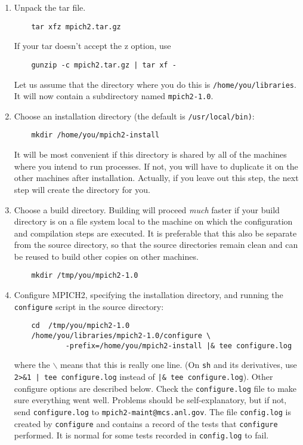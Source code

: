 \documentclass[dvipdfm,11pt]{article}
\begin{document}
\begin{enumerate}
\item 
Unpack the tar file.
\begin{verbatim}
    tar xfz mpich2.tar.gz
\end{verbatim}
If your tar doesn't accept the z option, use
\begin{verbatim}
    gunzip -c mpich2.tar.gz | tar xf -
\end{verbatim}
Let us assume that the directory where you do this is
\texttt{/home/you/libraries}.  It will now contain a subdirectory named
\texttt{mpich2-1.0}.

\item
Choose an installation directory (the default is \texttt{/usr/local/bin)}:
\begin{verbatim}
    mkdir /home/you/mpich2-install
\end{verbatim}
It will be most convenient if this directory is shared by all of the
machines where you intend to run processes.  If not, you will have
to duplicate it on the other machines after installation.  Actually, if
you leave out this step, the next step will create the directory for you.

\item
Choose a build directory.  Building will proceed \emph{much} faster if
your build directory is on a file system local to the machine on which
the configuration and compilation steps are executed.  It is preferable
that this also be separate from the source directory, so that the
source directories remain
clean and can be reused to build other copies on other machines.
\begin{verbatim}
    mkdir /tmp/you/mpich2-1.0
\end{verbatim}

\item
Configure MPICH2, specifying the installation directory, and running
the \texttt{configure} script in the source directory:
\begin{verbatim}
    cd  /tmp/you/mpich2-1.0
    /home/you/libraries/mpich2-1.0/configure \
            -prefix=/home/you/mpich2-install |& tee configure.log
\end{verbatim}
where the \texttt{$\backslash$} means that this is really one line.  (On
\texttt{sh} and its derivatives, use \verb+2>&1 | tee configure.log+
instead of \verb+|& tee configure.log+).  Other configure options are
described below.  Check the \texttt{configure.log} file to make sure
everything went well.  Problems should be self-explanatory, but if not,
send \texttt{configure.log} to \texttt{mpich2-maint@mcs.anl.gov}.
The file \texttt{config.log} is created by \texttt{configure} and
contains a record of the tests that \texttt{configure} performed.  It
is normal for some tests recorded in \texttt{config.log} to fail.  


\end{enumerate}
\end{document}
